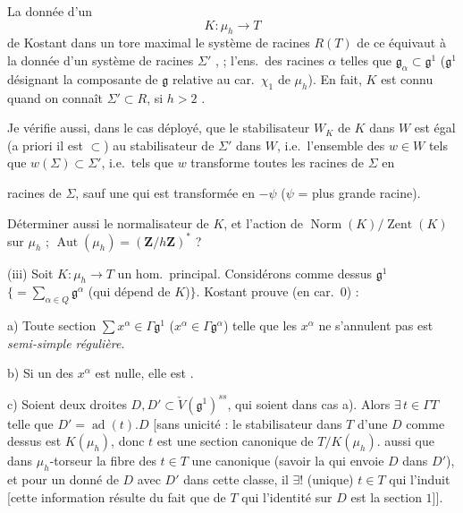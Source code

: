 \documentclass[11pt,a4paper]{article}
\begin{document}
La donnée d'un
\[
  K : \mu_{h} \longrightarrow T
\]
de Kostant dans un tore maximal  le système de racines
$R(T)$ de ce \ill{} équivaut à la donnée d'un système de racines $\Sigma'$
, \ill{}  ;
l'ens.\ des racines $\alpha$ telles que $\mathfrak{g}_{\alpha} \subset
\mathfrak{g}^{1}$ ($\mathfrak{g}^{1}$ désignant la composante de
$\mathfrak{g}$ relative au car.\ $\chi_{1}$ de $\mu_{h}$). En fait, $K$ est
connu quand on connaît \struck{\ill{}} $\Sigma' \subset R$, \struck{\ill{}}
si $h > 2$ \ill{}.

Je vérifie aussi, dans le cas déployé, que le 
stabilisateur $W_{K}$ de $K$ dans $W$ est égal (a priori il est $\subset$) au
stabilisateur de $\Sigma'$ dans $W$, i.e.\ l'ensemble des $w \in W$ tels que
$w(\Sigma) \subset \Sigma'$, i.e.\ tels que $w$ transforme toutes les racines
de $\Sigma$ en


racines de $\Sigma$, sauf une qui est transformée en $-\psi$ ($\psi$ = plus
grande racine).

Déterminer aussi le normalisateur de $K$, et l'action de
$\operatorname{Norm}(K)/\operatorname{Zent}(K)$ sur $\mu_{h}$ ;
$\operatorname{Aut}(\mu_{h}) = (\mathbf{Z}/h\mathbf{Z})^{*}$ ?

(iii) Soit \struck{\ill{}} $K : \mu_{h} \to T$ un hom.\ principal. Considérons
comme dessus
$\mathfrak{g}^{1}$ $\bigl\{= \sum_{\alpha \in Q} \mathfrak{g}^{\alpha}$ (qui
dépend de $K$)$\bigr\}$. Kostant prouve (en car.\ $0$) :

a) Toute section $\sum x^{\alpha} \in \Gamma\mathfrak{g}^{1}$
($x^{\alpha} \in \Gamma\mathfrak{g}^{\alpha}$) telle que les $x^{\alpha}$ ne
s'annulent pas est \emph{semi-simple régulière}.

b) Si un des $x^{\alpha}$ est nulle, elle est \emph{}.

c) Soient deux droites $D, D' \subset \check{V}(\mathfrak{g}^{1})^{ss}$, qui
soient  dans cas a).
Alors $\exists\, t \in \Gamma T$ telle que $D' = \operatorname{ad}(t).D$
[sans unicité : le stabilisateur dans $T$ d'une $D$ comme dessus est
$K(\mu_{h})$, donc $t$ est une section canonique de $T/K(\mu_{h})$.
\ill{} aussi que dans \struck{\ill{}} \ill{}
$\mu_{h}$-torseur \ill{} la fibre des $t \in T$ \ill{} une canonique
(savoir \struck{\ill{}} la \ill{} qui envoie $D$ dans $D'$), et pour un
\ill{} donné de $D$ avec $D'$ dans cette classe, il $\exists!$ (unique)
$t \in T$ qui l'induit [cette information résulte du fait que \ill{} de $T$
qui \ill{} l'identité sur $D$ est la section $1$]].
\end{document}
